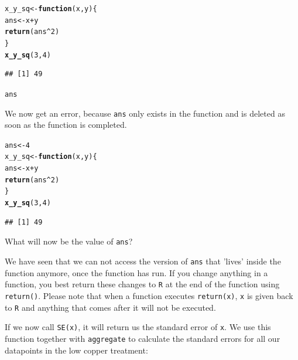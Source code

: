 \documentclass{article}\usepackage[]{graphicx}\usepackage[]{color}
\makeatletter
\newcommand{\hlnum}[1]{\textcolor[rgb]{0.686,0.059,0.569}{#1}}%
\newcommand{\hlopt}[1]{\textcolor[rgb]{0,0,0}{#1}}%
\newcommand{\hlstd}[1]{\textcolor[rgb]{0.345,0.345,0.345}{#1}}%
\newcommand{\hlkwa}[1]{\textcolor[rgb]{0.161,0.373,0.58}{\textbf{#1}}}%
\newcommand{\hlkwb}[1]{\textcolor[rgb]{0.69,0.353,0.396}{#1}}%
\newcommand{\hlkwc}[1]{\textcolor[rgb]{0.333,0.667,0.333}{#1}}%
\newcommand{\hlkwd}[1]{\textcolor[rgb]{0.737,0.353,0.396}{\textbf{#1}}}%
\newenvironment{kframe}{%
 \def\at@end@of@kframe{}%
 \ifinner\ifhmode%
  \def\at@end@of@kframe{\end{minipage}}%
  \begin{minipage}{\columnwidth}%
 \fi\fi%
 \def\FrameCommand##1{\hskip\@totalleftmargin \hskip-\fboxsep
 \colorbox{shadecolor}{##1}\hskip-\fboxsep
     \hskip-\linewidth \hskip-\@totalleftmargin \hskip\columnwidth}%
 \MakeFramed {\advance\hsize-\width
   \@totalleftmargin\z@ \linewidth\hsize
   \@setminipage}}%
 {\par\unskip\endMakeFramed%
 \at@end@of@kframe}
\newenvironment{knitrout}{}{} %
\makeatother
\begin{document}
\begin{mdframed}
\begin{knitrout}
\color{fgcolor}\begin{kframe}
\begin{alltt}
\hlstd{x_y_sq} \hlkwb{<-} \hlkwa{function}\hlstd{(}\hlkwc{x}\hlstd{,}\hlkwc{y}\hlstd{)\{}
  \hlstd{ans} \hlkwb{<-} \hlstd{x} \hlopt{+} \hlstd{y}
  \hlkwd{return}\hlstd{(ans}\hlopt{^}\hlnum{2}\hlstd{)}
\hlstd{\}}
\hlkwd{x_y_sq}\hlstd{(}\hlnum{3}\hlstd{,} \hlnum{4}\hlstd{)}
\end{alltt}
\begin{verbatim}
## [1] 49
\end{verbatim}
\begin{alltt}
\hlstd{ans}
\end{alltt}


{\ttfamily\noindent\bfseries\color{errorcolor}{\#\# Error in eval(expr, envir, enclos): object 'ans' not found}}\end{kframe}
\end{knitrout}
We now get an error, because \texttt{ans} only exists in the function and is deleted as soon as the function is completed. 
\begin{knitrout}
\color{fgcolor}\begin{kframe}
\begin{alltt}
\hlstd{ans} \hlkwb{<-} \hlnum{4}
\hlstd{x_y_sq} \hlkwb{<-} \hlkwa{function}\hlstd{(}\hlkwc{x}\hlstd{,}\hlkwc{y}\hlstd{)\{}
  \hlstd{ans} \hlkwb{<-} \hlstd{x} \hlopt{+} \hlstd{y}
  \hlkwd{return}\hlstd{(ans}\hlopt{^}\hlnum{2}\hlstd{)}
\hlstd{\}}
\hlkwd{x_y_sq}\hlstd{(}\hlnum{3}\hlstd{,} \hlnum{4}\hlstd{)}
\end{alltt}
\begin{verbatim}
## [1] 49
\end{verbatim}
\end{kframe}
\end{knitrout}
What will now be the value of \texttt{ans}?

We have seen that we can not access the version of \texttt{ans} that 'lives' inside the function anymore, once the function has run. If you change anything in a function, you best return these changes to \texttt{R} at the end of the function using \texttt{return()}. Please note that when a function executes \texttt{return(x)}, \texttt{x} is given back to \texttt{R} and anything that comes after it will not be executed.
\end{mdframed}
If we now call \texttt{SE(x)}, it will return us the standard error of \texttt{x}. We use this function together with \texttt{aggregate} to calculate the standard errors for all our datapoints in the low copper treatment:
\end{document}
